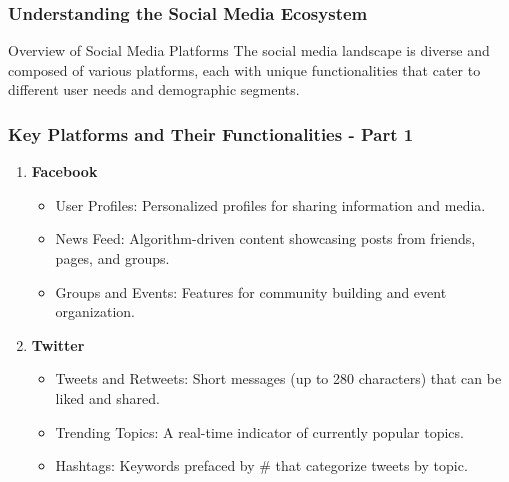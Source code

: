 \documentclass{beamer}
\begin{document}
\begin{frame}[fragile]
    \frametitle{Understanding the Social Media Ecosystem}
    \begin{block}{Overview of Social Media Platforms}
        The social media landscape is diverse and composed of various platforms, each with unique functionalities that cater to different user needs and demographic segments.
    \end{block}
\end{frame}

\begin{frame}[fragile]
    \frametitle{Key Platforms and Their Functionalities - Part 1}
    \begin{enumerate}
        \item \textbf{Facebook}
            \begin{itemize}
                \item User Profiles: Personalized profiles for sharing information and media.
                \item News Feed: Algorithm-driven content showcasing posts from friends, pages, and groups.
                \item Groups and Events: Features for community building and event organization.
            \end{itemize}
        
        \item \textbf{Twitter}
            \begin{itemize}
                \item Tweets and Retweets: Short messages (up to 280 characters) that can be liked and shared.
                \item Trending Topics: A real-time indicator of currently popular topics.
                \item Hashtags: Keywords prefaced by \# that categorize tweets by topic.
            \end{itemize}
    \end{enumerate}
\end{frame}
\end{document}
